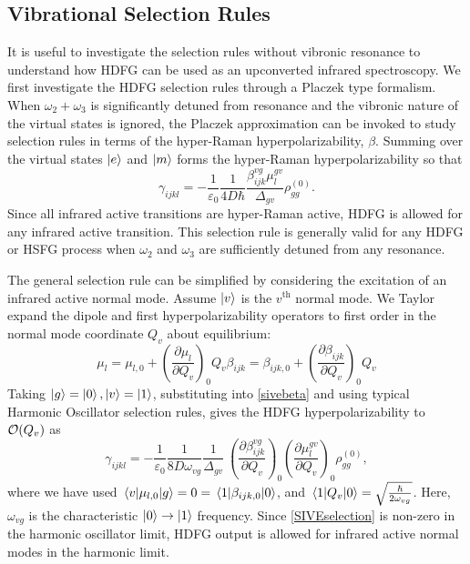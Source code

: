 \documentclass[aip, jcp, reprint, onecolumn, nofootinbib]{revtex4-2}
\begin{document}
\subsection{Vibrational Selection Rules}

It is useful to investigate the selection rules without vibronic resonance to understand how HDFG can be used as an upconverted infrared spectroscopy.
We first investigate the HDFG selection rules through a Placzek type formalism.
When $\omega_2+\omega_3$ is significantly detuned from resonance and the vibronic nature of the virtual states is ignored, the Placzek approximation can be invoked to study selection rules in terms of the hyper-Raman hyperpolarizability, $\beta$. \cite{Placzek1934, Long1970}
Summing over the virtual states $\ket{e}$ and $\ket{m}$ forms the hyper-Raman hyperpolarizability so that\cite{Long1970} 
\begin{equation}\label{sivebeta}
	\gamma_{ijkl} =	-\frac{1}{\varepsilon_0} \frac{1}{4D \hbar}\frac{\beta^{vg}_{ijk} \mu^{gv}_{l}}{\Delta_{gv}} \rho^{(0)}_{gg}.
\end{equation}
Since all infrared active transitions are hyper-Raman active, HDFG is allowed for any infrared active transition. \cite{Andrews1978}
This selection rule is generally valid for any HDFG or HSFG process when $\omega_2$ and $\omega_3$ are sufficiently detuned from any resonance.

The general selection rule can be simplified by considering the excitation of an infrared active normal mode.  
Assume $\ket{v}$ is the $v^{\text{th}}$ normal mode.
We Taylor expand the dipole and first hyperpolarizability operators to first order in the normal mode coordinate $Q_v$ about equilibrium:
\begin{subequations}
	\begin{equation}
		\mu_l = \mu_{l,0} + \left(\frac{\partial \mu_l}{\partial Q_v}\right)_0 Q_v 
	\end{equation}
	\begin{equation}
		\beta_{ijk} = \beta_{ijk,0} + \left(\frac{\partial \beta_{ijk}}{\partial Q_v}\right)_0 Q_v
	\end{equation}
\end{subequations}
Taking $\ket{g} = \ket{0}, \ket{v} = \ket{1}$, substituting into \autoref{sivebeta} and using typical Harmonic Oscillator selection rules, gives the HDFG hyperpolarizability to $\order{Q_v}$ as \begin{equation}\label{SIVEselection}
	\gamma_{ijkl} =	-\frac{1}{\varepsilon_0} \frac{1}{8D \omega_{vg}}  \frac{1}{{\Delta_{gv}}} \ \left(\frac{\partial \beta^{vg}_{ijk}}{\partial Q_v}\right)_0 \left({\frac{\partial \mu^{gv}_{l}}{\partial Q_v}}\right)_0  \rho^{(0)}_{gg},
\end{equation}
where we have used $\mel{v}{\mu_{l,0}}{g} = 0 = \mel{1}{\beta_{ijk,0}}{0}$, and $\mel{1}{Q_v}{0} = \sqrt{\frac{\hbar}{2\omega_{vg}}}$.
Here, $\omega_{vg}$ is the characteristic $\ket{0} \rightarrow \ket{1}$ frequency.\cite{RN459}
Since \autoref{SIVEselection} is non-zero in the harmonic oscillator limit, HDFG output is allowed for infrared active normal modes in the harmonic limit. 
\end{document}
